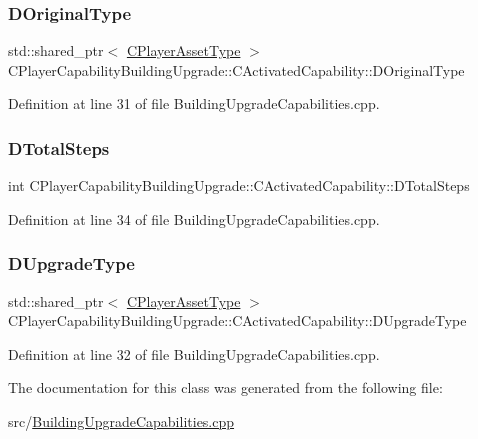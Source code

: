 \subsubsection{\texorpdfstring{D\+Original\+Type}{DOriginalType}}
{\footnotesize\ttfamily std\+::shared\+\_\+ptr$<$ \hyperlink{classCPlayerAssetType}{C\+Player\+Asset\+Type} $>$ C\+Player\+Capability\+Building\+Upgrade\+::\+C\+Activated\+Capability\+::\+D\+Original\+Type\hspace{0.3cm}{\ttfamily [protected]}}



Definition at line 31 of file Building\+Upgrade\+Capabilities.\+cpp.

\hypertarget{classCPlayerCapabilityBuildingUpgrade_1_1CActivatedCapability_a9c4ea12cf99701f8ce38e17e03ad0115}{}\label{classCPlayerCapabilityBuildingUpgrade_1_1CActivatedCapability_a9c4ea12cf99701f8ce38e17e03ad0115} 
\subsubsection{\texorpdfstring{D\+Total\+Steps}{DTotalSteps}}
{\footnotesize\ttfamily int C\+Player\+Capability\+Building\+Upgrade\+::\+C\+Activated\+Capability\+::\+D\+Total\+Steps\hspace{0.3cm}{\ttfamily [protected]}}



Definition at line 34 of file Building\+Upgrade\+Capabilities.\+cpp.

\hypertarget{classCPlayerCapabilityBuildingUpgrade_1_1CActivatedCapability_a625885c25af00ac23b85f95fc44f897d}{}\label{classCPlayerCapabilityBuildingUpgrade_1_1CActivatedCapability_a625885c25af00ac23b85f95fc44f897d} 
\subsubsection{\texorpdfstring{D\+Upgrade\+Type}{DUpgradeType}}
{\footnotesize\ttfamily std\+::shared\+\_\+ptr$<$ \hyperlink{classCPlayerAssetType}{C\+Player\+Asset\+Type} $>$ C\+Player\+Capability\+Building\+Upgrade\+::\+C\+Activated\+Capability\+::\+D\+Upgrade\+Type\hspace{0.3cm}{\ttfamily [protected]}}



Definition at line 32 of file Building\+Upgrade\+Capabilities.\+cpp.



The documentation for this class was generated from the following file\+:\begin{DoxyCompactItemize}
\item 
src/\hyperlink{BuildingUpgradeCapabilities_8cpp}{Building\+Upgrade\+Capabilities.\+cpp}\end{DoxyCompactItemize}
